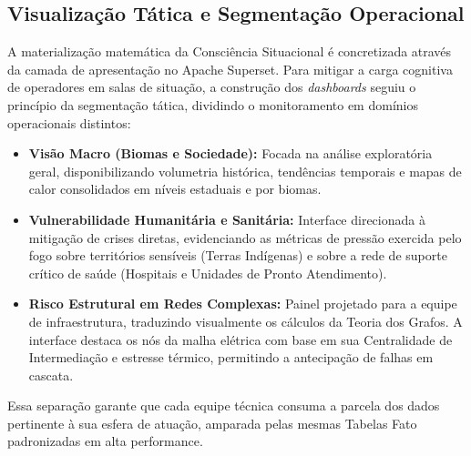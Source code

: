 \subsection{Visualização Tática e Segmentação Operacional}

A materialização matemática da Consciência Situacional é concretizada através da camada de apresentação no Apache Superset. Para mitigar a carga cognitiva de operadores em salas de situação, a construção dos \textit{dashboards} seguiu o princípio da segmentação tática, dividindo o monitoramento em domínios operacionais distintos:

\begin{itemize}
    \item \textbf{Visão Macro (Biomas e Sociedade):} Focada na análise exploratória geral, disponibilizando volumetria histórica, tendências temporais e mapas de calor consolidados em níveis estaduais e por biomas.
    \item \textbf{Vulnerabilidade Humanitária e Sanitária:} Interface direcionada à mitigação de crises diretas, evidenciando as métricas de pressão exercida pelo fogo sobre territórios sensíveis (Terras Indígenas) e sobre a rede de suporte crítico de saúde (Hospitais e Unidades de Pronto Atendimento).
    \item \textbf{Risco Estrutural em Redes Complexas:} Painel projetado para a equipe de infraestrutura, traduzindo visualmente os cálculos da Teoria dos Grafos. A interface destaca os nós da malha elétrica com base em sua Centralidade de Intermediação e estresse térmico, permitindo a antecipação de falhas em cascata.
\end{itemize}

Essa separação garante que cada equipe técnica consuma a parcela dos dados pertinente à sua esfera de atuação, amparada pelas mesmas Tabelas Fato padronizadas em alta performance.
